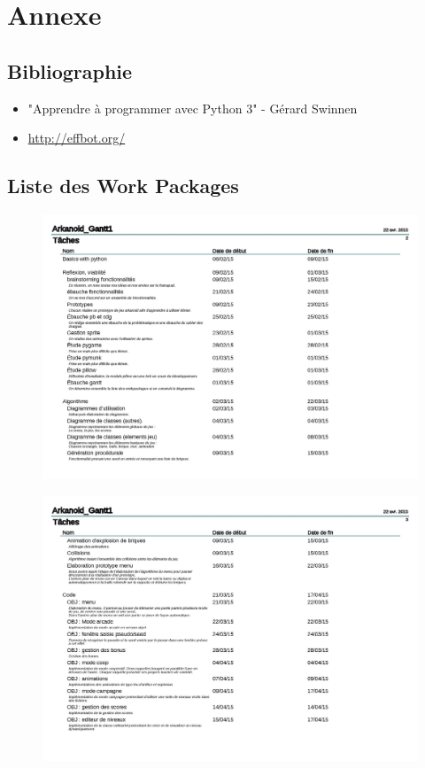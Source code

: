 \section{Annexe}
  \subsection{Bibliographie}
    \begin{itemize}
    	\item "Apprendre à programmer avec Python 3" - Gérard Swinnen
    	\item \href{http://effbot.org/}{http://effbot.org/}
    \end{itemize}

  \subsection{Liste des Work Packages}
  \begin{figure}[h!]
    \includegraphics[width=1\textwidth]{img/WK1.jpg}\\
  \end{figure}
  \begin{figure}[h!]
    \includegraphics[width=1\textwidth]{img/WK2.jpg}\\
  \end{figure}
